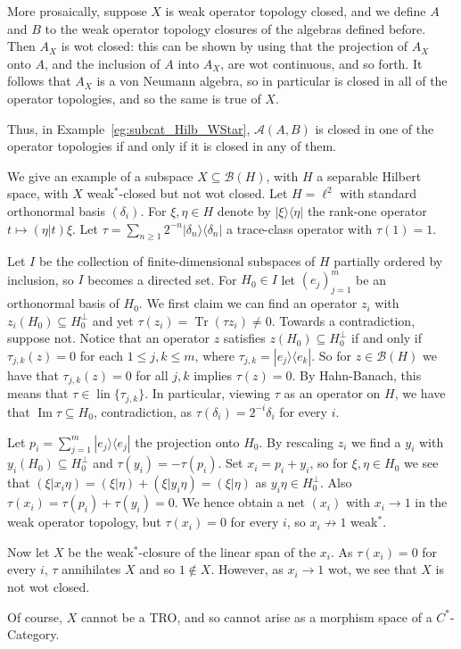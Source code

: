 \documentclass[a4paper,11pt]{article}
\theoremstyle{plain}
\theoremstyle{remark}
\newenvironment{example}
  {\pushQED{\qed}\renewcommand{\qedsymbol}{$\triangle$}\examplex}
  {\popQED\endexamplex}
\newcommand{\mc}[1]{\mathcal{#1}}
\newcommand{\lin}{\operatorname{lin}}
\newcommand{\Tr}{{\operatorname{Tr}}}
\newcommand{\im}{{\operatorname{Im}}}
\newcommand{\rankone}[2]{|{#1}\rangle\langle{#2}|}
\begin{document}
More prosaically, suppose $X$ is weak operator topology closed, and we define $A$ and $B$ to the weak operator topology closures of the algebras defined before.  Then $A_X$ is wot closed: this can be shown by using that the projection of $A_X$ onto $A$, and the inclusion of $A$ into $A_X$, are wot continuous, and so forth.  It follows that $A_X$ is a von Neumann algebra, so in particular is closed in all of the operator topologies, and so the same is true of $X$.

\begin{example}
Thus, in Example~\ref{eg:subcat_Hilb_WStar}, $\mc A(A,B)$ is closed in one of the operator topologies if and only if it is closed in any of them.
\end{example}

\begin{example}
We give an example of a subspace $X\subseteq\mc B(H)$, with $H$ a separable Hilbert space, with $X$ weak$^*$-closed but not wot closed.  Let $H = \ell^2$ with standard orthonormal basis $(\delta_i)$.  For $\xi,\eta\in H$ denote by $\rankone{\xi}{\eta}$ the rank-one operator $t \mapsto (\eta|t)\xi$.  Let $\tau = \sum_{n\geq 1} 2^{-n} \rankone{\delta_n}{\delta_n}$ a trace-class operator with $\tau(1) = 1$.

Let $I$ be the collection of finite-dimensional subspaces of $H$ partially ordered by inclusion, so $I$ becomes a directed set.  For $H_0\in I$ let $(e_j)_{j=1}^m$ be an orthonormal basis of $H_0$.  We first claim we can find an operator $z_i$ with $z_i(H_0) \subseteq H_0^\perp$ and yet $\tau(z_i) = \Tr(\tau z_i)\not=0$.  Towards a contradiction, suppose not.  Notice that an operator $z$ satisfies $z(H_0) \subseteq H_0^\perp$ if and only if $\tau_{j,k}(z)=0$ for each $1\leq j,k\leq m$, where $\tau_{j,k} = \rankone{e_j}{e_k}$.  So for $z\in\mc B(H)$ we have that $\tau_{j,k}(z)=0$ for all $j,k$ implies $\tau(z)=0$.  By Hahn-Banach, this means that $\tau \in \lin \{ \tau_{j,k} \}$.  In particular, viewing $\tau$ as an operator on $H$, we have that $\im\tau \subseteq H_0$, contradiction, as $\tau(\delta_i) = 2^{-i}\delta_i$ for every $i$.

Let $p_i = \sum_{j=1}^m \rankone{e_j}{e_j}$ the projection onto $H_0$.  By rescaling $z_i$ we find a $y_i$ with $y_i(H_0)\subseteq H_0^\perp$ and $\tau(y_i) = -\tau(p_i)$.  Set $x_i = p_i + y_i$, so for $\xi,\eta\in H_0$ we see that $(\xi|x_i\eta) = (\xi|\eta) + (\xi|y_i\eta) = (\xi|\eta)$ as $y_i\eta\in H_0^\perp$.  Also $\tau(x_i) = \tau(p_i) + \tau(y_i) = 0$.  We hence obtain a net $(x_i)$ with $x_i \to 1$ in the weak operator topology, but $\tau(x_i)=0$ for every $i$, so $x_i \not\to 1$ weak$^*$.

Now let $X$ be the weak$^*$-closure of the linear span of the $x_i$.  As $\tau(x_i)=0$ for every $i$, $\tau$ annihilates $X$ and so $1\not\in X$.  However, as $x_i\to 1$ wot, we see that $X$ is not wot closed.

Of course, $X$ cannot be a TRO, and so cannot arise as a morphism space of a $C^*$-Category.
\end{example}
\end{document}
